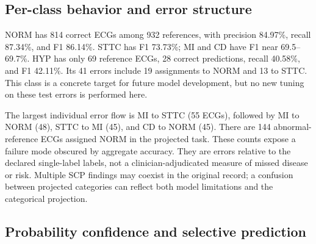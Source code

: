 \subsection{Per-class behavior and error structure}
\begin{table}[htbp]\centering\small

\caption{Released-stack class-specific results. Support is the number of reference ECGs; predicted is the number assigned that class. P, R, and F1 are percentages.}\label{tab:perclass}\end{table}


NORM has 814 correct ECGs among 932 references, with precision 84.97\%, recall 87.34\%, and F1 86.14\%. STTC has F1 73.73\%; MI and CD have F1 near 69.5--69.7\%. HYP has only 69 reference ECGs, 28 correct predictions, recall 40.58\%, and F1 42.11\%. Its 41 errors include 19 assignments to NORM and 13 to STTC. This class is a concrete target for future model development, but no new tuning on these test errors is performed here.

The largest individual error flow is MI to STTC (55 ECGs), followed by MI to NORM (48), STTC to MI (45), and CD to NORM (45). There are 144 abnormal-reference ECGs assigned NORM in the projected task. These counts expose a failure mode obscured by aggregate accuracy. They are errors relative to the declared single-label labels, not a clinician-adjudicated measure of missed disease or risk. Multiple SCP findings may coexist in the original record; a confusion between projected categories can reflect both model limitations and the categorical projection.

\subsection{Probability confidence and selective prediction}
\begin{table}[htbp]\centering\small

\caption{Confidence diagnostics independently recovered from the saved released probability vectors. Brier uses a sum across the five classes. ECE is on the 0--1 probability scale.}\label{tab:calibration}\end{table}

